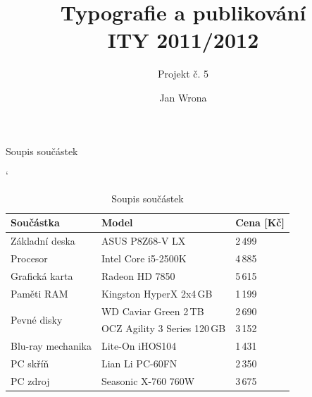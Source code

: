 \documentclass[pdf, frames]{prosper}[28.04.2012]
\title{Typografie a publikování\\ \quad ITY 2011/2012}
\subtitle{Projekt č. 5}
\author{Jan Wrona}
\begin{document}
\maketitle
{}

\begin{slide}[Dissolve]{Soupis součástek}
  \begin{table}
  \catcode`
  \begin{tabular}{|l|l|l|}
    \hline
    \rowcolor[gray]{0.5}
    Součástka & Model & Cena [Kč]\\ \hline
    Základní deska & ASUS P8Z68-V LX & 2\,499\\ \hline
    Procesor & Intel Core i5-2500K & 4\,885\\ \hline
    Grafická karta & Radeon HD 7850 & 5\,615\\ \hline
    Paměti RAM & Kingston HyperX 2x4\,GB & 1\,199\\ \hline
    \multirow{2}{*}{Pevné disky} & WD Caviar Green 2\,TB & 2\,690 \\ \cline{2-3}
     & OCZ Agility 3 Series 120\,GB & 3\,152\\ \hline
    Blu-ray mechanika & Lite-On iHOS104 & 1\,431 \\ \hline
    PC skříň & Lian Li PC-60FN & 2\,350\\ \hline
    PC zdroj & Seasonic X-760 760W & 3\,675\\ \hline
  \end{tabular}
  \caption{Soupis součástek}
  \end{table}
\end{slide}
\end{document}
